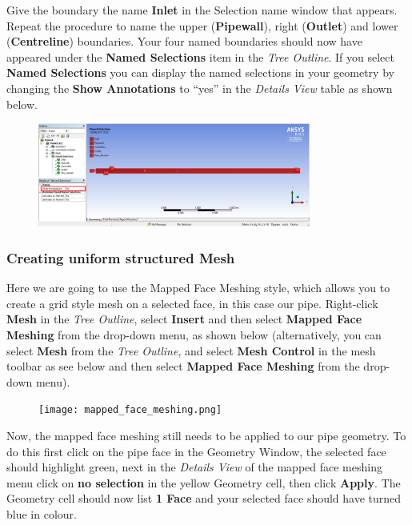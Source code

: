\documentclass[11pt,a4paper,oneside]{scrartcl}
\newcommand\bfr[1]{\textcolor[rgb]{1,0.00,0.00}{\textbf{\textsf{#1}}}}
\begin{document}
Give the boundary the name \bfr{Inlet} in the Selection name window that appears. Repeat the procedure to name the upper (\bfr{Pipewall}), right (\bfr{Outlet}) and lower (\bfr{Centreline}) boundaries. Your four named boundaries should now have appeared under the \bfr{Named Selections} item in the \emph{Tree Outline}. If you select \bfr{Named Selections} you can display the named selections in your geometry by changing the \bfr{Show Annotations} to ``yes'' in the \emph{Details View} table as shown below.

\begin{figure}[H]
\begin{center}
\includegraphics[width=0.8\textwidth,clip]{Named_selections.png}
\end{center}
\end{figure}


\subsubsection{Creating uniform structured Mesh}
Here we are going to use the Mapped Face Meshing style, which allows you to create a grid style mesh on a selected face, in this case our pipe. Right-click \bfr{Mesh} in the \emph{Tree Outline}, select \bfr{Insert} and then select \bfr{Mapped Face Meshing} from the drop-down menu, as shown below (alternatively, you can select \bfr{Mesh} from the \emph{Tree Outline}, and select \bfr{Mesh Control} in the mesh toolbar as see below and then select \bfr{Mapped Face Meshing} from the drop-down menu).

\begin{figure}[H]
\begin{center}
\texttt{[image: mapped\_face\_meshing.png]}
\end{center}
\end{figure}

Now, the mapped face meshing still needs to be applied to our pipe geometry. To do this first click on the pipe face in the Geometry Window, the selected face should highlight green, next in the \emph{Details View} of the mapped face meshing menu click on \bfr{no selection} in the yellow Geometry cell, then click \bfr{Apply}. The Geometry cell should now list \bfr{1 Face} and your selected face should have turned blue in colour.
\end{document}
